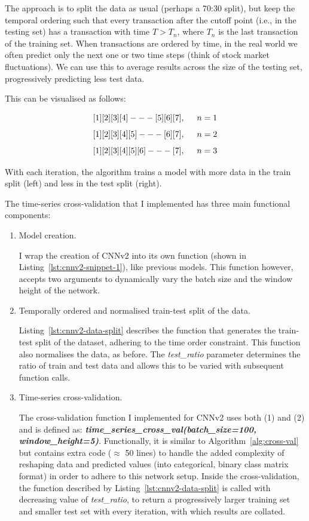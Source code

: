 \documentclass[12pt,a4paper,twoside]{report}
\begin{document}
The approach is to split the data as usual (perhaps a 70:30 split), but keep the temporal ordering such that every transaction after the cutoff point (i.e., in the testing set) has a transaction with time $T > T_{n} $, where $T_{n}$ is the last transaction of the training set. When transactions are ordered by time, in the real world we often predict only the next one or two time steps (think of stock market fluctuations). We can use this to average results across the size of the testing set, progressively predicting less test data. 

This can be visualised as follows:

$$ [1] [2] [3] [4]  --- [5] [6] [7] , \hspace{5mm}  n=1$$
$$ [1] [2] [3] [4] [5] --- [6] [7] ,\hspace{5mm}  n=2$$
$$ [1] [2] [3] [4] [5] [6] --- [7] ,\hspace{5mm}  n=3$$

With each iteration, the algorithm trains a model with more data in the train split (left) and less in the test split (right).

The time-series cross-validation that I implemented has three main functional components:
\begin{enumerate}
\item Model creation. 

I wrap the creation of CNNv2 into its own function (shown in Listing~\ref{lst:cnnv2-snippet-1}), like previous models. This function however, accepts two arguments to dynamically vary the batch size and the window height of the network.

\item Temporally ordered and normalised train-test split of the data.

Listing~\ref{lst:cnnv2-data-split} describes the function that generates the train-test split of the dataset, adhering to the time order constraint. This function also normalises the data, as before. The \emph{test\_ratio} parameter determines the ratio of train and test data and allows this to be varied with subsequent function calls. 

\item Time-series cross-validation.

The cross-validation function I implemented for CNNv2 uses both (1) and (2) and is defined as: \emph{\textbf{time\_series\_cross\_val(batch\_size=100, window\_height=5)}}. Functionally, it is similar to Algorithm~\ref{alg:cross-val} but contains extra code ($\approx$ 50 lines) to handle the added complexity of reshaping data and predicted values (into categorical, binary class matrix format) in order to adhere to this network setup. Inside the cross-validation, the function described by Listing~\ref{lst:cnnv2-data-split} is called with decreasing value of \emph{test\_ratio}, to return a progressively larger training set and smaller test set with every iteration, with which results are collated.

\end{enumerate}
\end{document}
